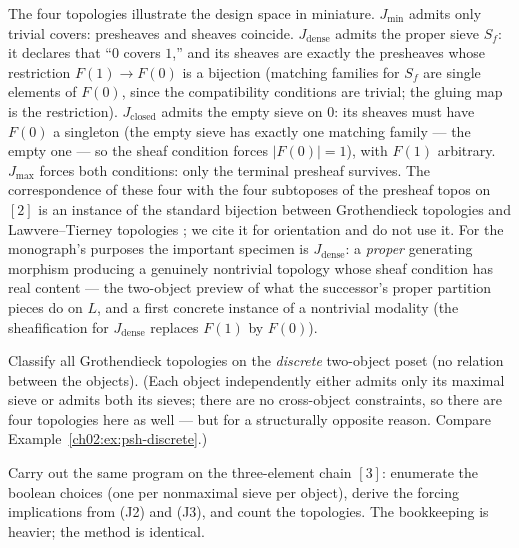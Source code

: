 \begin{remark}\label{ch03:rem:four-reading}
The four topologies illustrate the design space in miniature.
$J_{\min}$ admits only trivial covers: presheaves and sheaves
coincide. $J_{\mathrm{dense}}$ admits the proper sieve $S_f$: it
declares that ``$0$ covers $1$,'' and its sheaves are exactly the
presheaves whose restriction $F(1) \to F(0)$ is a bijection
(matching families for $S_f$ are single elements of $F(0)$, since
the compatibility conditions are trivial; the gluing map is the
restriction). $J_{\mathrm{closed}}$ admits the empty sieve on
$0$: its sheaves must have $F(0)$ a singleton (the empty sieve has
exactly one matching family --- the empty one --- so the sheaf
condition forces $|F(0)| = 1$), with $F(1)$ arbitrary.
$J_{\max}$ forces both conditions: only the terminal presheaf
survives. The correspondence of these four with the four
subtoposes of the presheaf topos on $[2]$ is an instance of the
standard bijection between Grothendieck topologies and
Lawvere--Tierney topologies \cite[Ch.~V]{maclane}
\cite{johnstone}; we cite it for orientation and do not use it.
For the monograph's purposes the important specimen is
$J_{\mathrm{dense}}$: a \emph{proper} generating morphism
producing a genuinely nontrivial topology whose sheaf condition
has real content --- the two-object preview of what the
successor's proper partition pieces do on $L$, and a first
concrete instance of a nontrivial modality (the sheafification
for $J_{\mathrm{dense}}$ replaces $F(1)$ by $F(0)$).
\end{remark}

\begin{exercise}\label{ch03:exr:discrete-two}
Classify all Grothendieck topologies on the \emph{discrete}
two-object poset (no relation between the objects). (Each object
independently either admits only its maximal sieve or admits both
its sieves; there are no cross-object constraints, so there are
four topologies here as well --- but for a structurally opposite
reason. Compare Example~\ref{ch02:ex:psh-discrete}.)
\end{exercise}

\begin{exercise}\label{ch03:exr:three-chain}
Carry out the same program on the three-element chain $[3]$:
enumerate the boolean choices (one per nonmaximal sieve per
object), derive the forcing implications from (J2) and (J3), and
count the topologies. The bookkeeping is heavier; the method is
identical.
\end{exercise}


